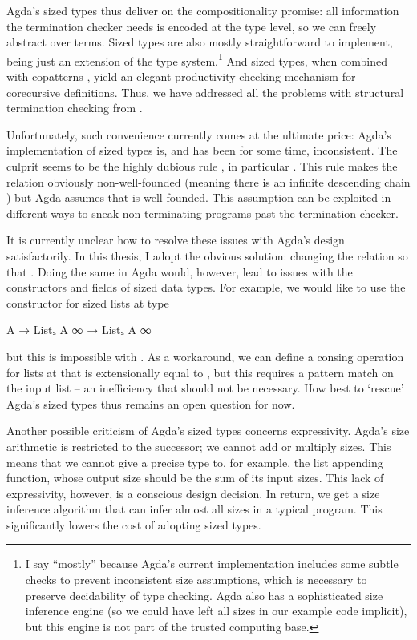 Agda's sized types thus deliver on the compositionality promise: all information
the termination checker needs is encoded at the type level, so we can freely
abstract over terms. Sized types are also mostly straightforward to implement,
being just an extension of the type system.\footnote{I say \enquote{mostly}
  because Agda's current implementation includes some subtle checks to prevent
  inconsistent size assumptions, which is necessary to preserve decidability of
  type checking. Agda also has a sophisticated size inference engine (so we
  could have left all sizes in our example code implicit), but this engine is
  not part of the trusted computing base.} And sized types, when combined with
copatterns \cite{abel2016}, yield an elegant productivity checking mechanism for
corecursive definitions. Thus, we have addressed all the problems with
structural termination checking from .

Unfortunately, such convenience currently comes at the ultimate price: Agda's
implementation of sized types is, and has been for some time, inconsistent. The
culprit seems to be the highly dubious rule , in particular
. This rule makes the \icode{<} relation obviously non-well-founded
(meaning there is an infinite descending chain ) but Agda
assumes that \icode{<} is well-founded. This assumption can be exploited in
different ways \cite{agdabug2015,agdabug2016,agdabug2017,agdabug2018} to sneak
non-terminating programs past the termination checker.

It is currently unclear how to resolve these issues with Agda's design
satisfactorily. In this thesis, I adopt the obvious solution: changing the
\icode{<} relation so that . Doing the same in Agda would, however,
lead to issues with the constructors and fields of sized data types. For
example, we would like to use the  constructor for sized lists at
type
\begin{code}
  A → Listₛ A ∞ → Listₛ A ∞
\end{code}
but this is impossible with . As a workaround, we can define a
consing operation for lists at  that is extensionally equal to
, but this requires a pattern match on the input list -- an
inefficiency that should not be necessary. How best to \enquote*{rescue} Agda's
sized types thus remains an open question for now.

Another possible criticism of Agda's sized types concerns expressivity. Agda's
size arithmetic is restricted to the successor; we cannot add or multiply sizes.
This means that we cannot give a precise type to, for example, the list
appending function, whose output size should be the sum of its input sizes. This
lack of expressivity, however, is a conscious design decision. In return, we get
a size inference algorithm that can infer almost all sizes in a typical program.
This significantly lowers the cost of adopting sized types.
